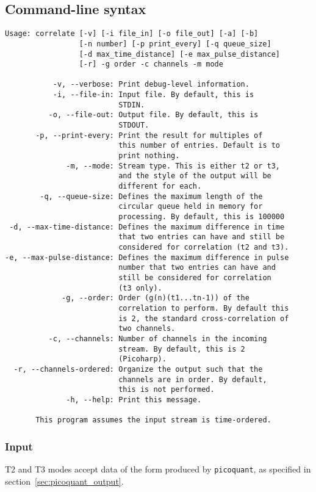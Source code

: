 \documentclass{article}
\newcommand{\picoquant}{\texttt{picoquant}}
\begin{document}
\subsection{Command-line syntax}
\begin{verbatim}
Usage: correlate [-v] [-i file_in] [-o file_out] [-a] [-b] 
                 [-n number] [-p print_every] [-q queue_size]
                 [-d max_time_distance] [-e max_pulse_distance]
                 [-r] -g order -c channels -m mode

           -v, --verbose: Print debug-level information.
           -i, --file-in: Input file. By default, this is 
                          STDIN.
          -o, --file-out: Output file. By default, this is 
                          STDOUT.
       -p, --print-every: Print the result for multiples of 
                          this number of entries. Default is to
                          print nothing.
              -m, --mode: Stream type. This is either t2 or t3,
                          and the style of the output will be
                          different for each.
        -q, --queue-size: Defines the maximum length of the 
                          circular queue held in memory for
                          processing. By default, this is 100000
 -d, --max-time-distance: Defines the maximum difference in time
                          that two entries can have and still be
                          considered for correlation (t2 and t3).
-e, --max-pulse-distance: Defines the maximum difference in pulse
                          number that two entries can have and 
                          still be considered for correlation 
                          (t3 only).
             -g, --order: Order (g(n)(t1...tn-1)) of the 
             			  correlation to perform. By default this
             			  is 2, the standard cross-correlation of
             			  two channels.
          -c, --channels: Number of channels in the incoming
                          stream. By default, this is 2 
                          (Picoharp).
  -r, --channels-ordered: Organize the output such that the 
                          channels are in order. By default, 
                          this is not performed.
              -h, --help: Print this message.

       This program assumes the input stream is time-ordered.
\end{verbatim}

\subsubsection{Input}
T2 and T3 modes accept data of the form produced by \picoquant, as specified in section~\ref{sec:picoquant_output}.
\end{document}
